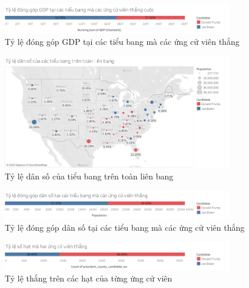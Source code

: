 \documentclass[14pt, a4paper]{article}
\numberwithin{equation}{section}
\numberwithin{figure}{section}
\numberwithin{dl}{section}
\numberwithin{md}{section}
\numberwithin{bd}{section}
\numberwithin{dn}{section}
\numberwithin{hq}{section}
\begin{document}
    \begin{figure}[h!]
        \centering
        \includegraphics[width=0.9\textwidth]{State_Percentage_GDP_Candidate.png}
        \caption{Tỷ lệ đóng góp GDP tại các tiểu bang mà các ứng cử viên thắng}
    \end{figure}

    \begin{figure}[h!]
        \centering
        \includegraphics[width=0.9\textwidth]{State_Percentage_Population_Circle.png}
        \caption{Tỷ lệ dân số của tiểu bang trên toàn liên bang}
    \end{figure}

    \begin{figure}[h!]
        \centering
        \includegraphics[width=0.9\textwidth]{figures/State_Percentage_Population_Candidate.png}
        \caption{Tỷ lệ đóng góp dân số tại các tiểu bang mà các ứng cử viên thắng}
    \end{figure}

    \begin{figure}[h!]
        \centering
        \includegraphics[width=0.9\textwidth]{figures/County_Total_Percentage_Candidate_Win.png}
        \caption{Tỷ lệ thắng trên các hạt của từng ứng cử viên}
    \end{figure}
\end{document}
